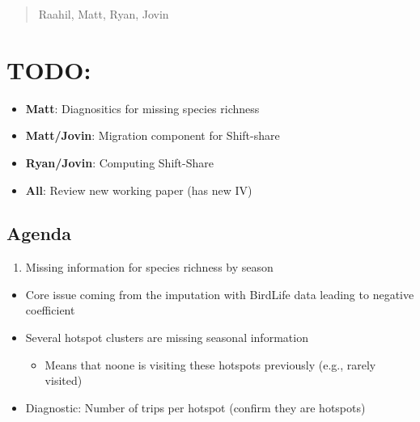 \documentclass[
  letterpaper,
]{article}
\providecommand{\tightlist}{%
  \setlength{\itemsep}{0pt}\setlength{\parskip}{0pt}}\usepackage{longtable,booktabs,array}
\begin{document}
\begin{tcolorbox}[enhanced jigsaw, leftrule=.75mm, opacitybacktitle=0.6, colbacktitle=quarto-callout-note-color!10!white, arc=.35mm, colframe=quarto-callout-note-color-frame, bottomtitle=1mm, coltitle=black, left=2mm, toptitle=1mm, opacityback=0, colback=white, breakable, bottomrule=.15mm, toprule=.15mm, title=\textcolor{quarto-callout-note-color}{\faInfo}\hspace{0.5em}{9/12/2025}, rightrule=.15mm, titlerule=0mm]

\begin{quote}
Raahil, Matt, Ryan, Jovin
\end{quote}

\section{TODO:}\label{todo}

\begin{itemize}
\tightlist
\item
  \textbf{Matt}: Diagnositics for missing species richness
\item
  \textbf{Matt/Jovin}: Migration component for Shift-share
\item
  \textbf{Ryan/Jovin}: Computing Shift-Share
\item
  \textbf{All}: Review new working paper (has new IV)
\end{itemize}

\subsection{Agenda}\label{agenda}

\begin{enumerate}
\def\labelenumi{\arabic{enumi}.}
\tightlist
\item
  Missing information for species richness by season
\end{enumerate}

\begin{itemize}
\tightlist
\item
  Core issue coming from the imputation with BirdLife data leading to
  negative coefficient
\item
  Several hotspot clusters are missing seasonal information

  \begin{itemize}
  \tightlist
  \item
    Means that noone is visiting these hotspots previously (e.g., rarely
    visited)
  \end{itemize}
\item
  Diagnostic: Number of trips per hotspot (confirm they are hotspots)


\end{itemize}
\end{tcolorbox}
\end{document}
